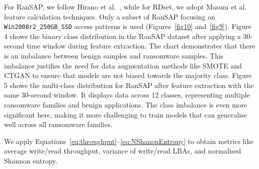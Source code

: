  For RanSAP, we follow Hirano et al.~\cite{hirano2022ransap}, while for RDset,  we adopt Masum et al.~\cite{masum2022ransomware} feature  calculation techniques. Only a subset of RanSAP focusing on \texttt{Win2008r2\_250GB\_SSD} access patterns is used (Figures~\ref{fig10} and~\ref{fig9}). Figure 4 shows the binary class distribution in the RanSAP dataset after applying a 30-second time window during feature extraction. The chart demonstrates that there is an imbalance between benign samples and ransomware samples. This imbalance justifies the need for data augmentation methods like SMOTE and CTGAN to ensure that models are not biased towards the majority class. Figure 5 shows the multi-class distribution for RanSAP after feature extraction with the same 30-second window. It displays data across 12 classes, representing multiple ransomware families and benign applications. The class imbalance is even more significant here, making it more challenging to train models that can generalise well across all ransomware families.

 
 We apply Equations~\ref{eq:throughput}--\ref{eq:NShanonEntropy} to obtain metrics like average write/read throughput, variance of write/read LBAs, and normalised Shannon entropy.

